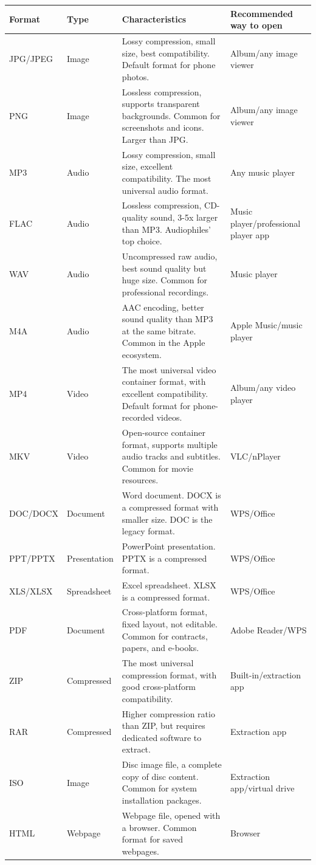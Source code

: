 \begin{center}
\begin{tabularx}{\linewidth}{|X|X|X|X|}
\hline
\textbf{Format} & \textbf{Type} & \textbf{Characteristics} & \textbf{Recommended way to open} \tabularnewline
\hline
JPG/JPEG & Image & Lossy compression, small size, best compatibility. Default format for phone photos. & Album/any image viewer \tabularnewline
PNG & Image & Lossless compression, supports transparent backgrounds. Common for screenshots and icons. Larger than JPG. & Album/any image viewer \tabularnewline
MP3 & Audio & Lossy compression, small size, excellent compatibility. The most universal audio format. & Any music player \tabularnewline
FLAC & Audio & Lossless compression, CD-quality sound, 3-5x larger than MP3. Audiophiles' top choice. & Music player/professional player app \tabularnewline
WAV & Audio & Uncompressed raw audio, best sound quality but huge size. Common for professional recordings. & Music player \tabularnewline
M4A & Audio & AAC encoding, better sound quality than MP3 at the same bitrate. Common in the Apple ecosystem. & Apple Music/music player \tabularnewline
MP4 & Video & The most universal video container format, with excellent compatibility. Default format for phone-recorded videos. & Album/any video player \tabularnewline
MKV & Video & Open-source container format, supports multiple audio tracks and subtitles. Common for movie resources. & VLC/nPlayer \tabularnewline
DOC/DOCX & Document & Word document. DOCX is a compressed format with smaller size. DOC is the legacy format. & WPS/Office \tabularnewline
PPT/PPTX & Presentation & PowerPoint presentation. PPTX is a compressed format. & WPS/Office \tabularnewline
XLS/XLSX & Spreadsheet & Excel spreadsheet. XLSX is a compressed format. & WPS/Office \tabularnewline
PDF & Document & Cross-platform format, fixed layout, not editable. Common for contracts, papers, and e-books. & Adobe Reader/WPS \tabularnewline
ZIP & Compressed & The most universal compression format, with good cross-platform compatibility. & Built-in/extraction app \tabularnewline
RAR & Compressed & Higher compression ratio than ZIP, but requires dedicated software to extract. & Extraction app \tabularnewline
ISO & Image & Disc image file, a complete copy of disc content. Common for system installation packages. & Extraction app/virtual drive \tabularnewline
HTML & Webpage & Webpage file, opened with a browser. Common format for saved webpages. & Browser \tabularnewline
\hline
\end{tabularx}
\end{center}

